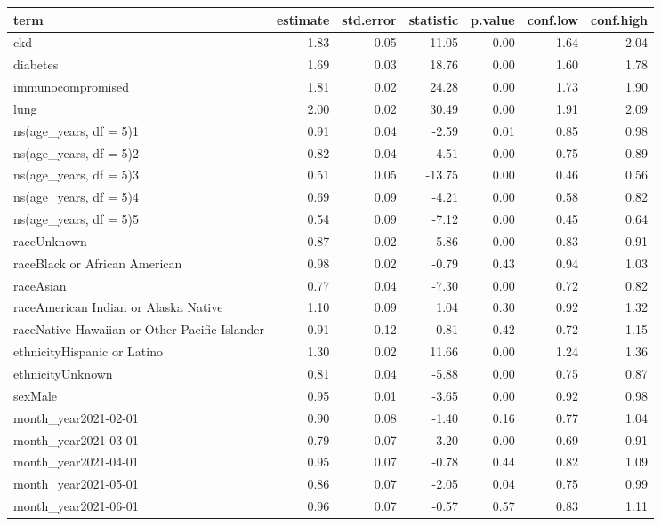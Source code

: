 \begin{table}[!htbp]
\centering
\begin{tabular}{lrrrrrr}
  \hline
term & estimate & std.error & statistic & p.value & conf.low & conf.high \\ 
  \hline
ckd & 1.83 & 0.05 & 11.05 & 0.00 & 1.64 & 2.04 \\ 
  diabetes & 1.69 & 0.03 & 18.76 & 0.00 & 1.60 & 1.78 \\ 
  immunocompromised & 1.81 & 0.02 & 24.28 & 0.00 & 1.73 & 1.90 \\ 
  lung & 2.00 & 0.02 & 30.49 & 0.00 & 1.91 & 2.09 \\ 
  ns(age\_years, df = 5)1 & 0.91 & 0.04 & -2.59 & 0.01 & 0.85 & 0.98 \\ 
  ns(age\_years, df = 5)2 & 0.82 & 0.04 & -4.51 & 0.00 & 0.75 & 0.89 \\ 
  ns(age\_years, df = 5)3 & 0.51 & 0.05 & -13.75 & 0.00 & 0.46 & 0.56 \\ 
  ns(age\_years, df = 5)4 & 0.69 & 0.09 & -4.21 & 0.00 & 0.58 & 0.82 \\ 
  ns(age\_years, df = 5)5 & 0.54 & 0.09 & -7.12 & 0.00 & 0.45 & 0.64 \\ 
  raceUnknown & 0.87 & 0.02 & -5.86 & 0.00 & 0.83 & 0.91 \\ 
  raceBlack or African American & 0.98 & 0.02 & -0.79 & 0.43 & 0.94 & 1.03 \\ 
  raceAsian & 0.77 & 0.04 & -7.30 & 0.00 & 0.72 & 0.82 \\ 
  raceAmerican Indian or Alaska Native & 1.10 & 0.09 & 1.04 & 0.30 & 0.92 & 1.32 \\ 
  raceNative Hawaiian or Other Pacific Islander & 0.91 & 0.12 & -0.81 & 0.42 & 0.72 & 1.15 \\ 
  ethnicityHispanic or Latino & 1.30 & 0.02 & 11.66 & 0.00 & 1.24 & 1.36 \\ 
  ethnicityUnknown & 0.81 & 0.04 & -5.88 & 0.00 & 0.75 & 0.87 \\ 
  sexMale & 0.95 & 0.01 & -3.65 & 0.00 & 0.92 & 0.98 \\ 
  month\_year2021-02-01 & 0.90 & 0.08 & -1.40 & 0.16 & 0.77 & 1.04 \\ 
  month\_year2021-03-01 & 0.79 & 0.07 & -3.20 & 0.00 & 0.69 & 0.91 \\ 
  month\_year2021-04-01 & 0.95 & 0.07 & -0.78 & 0.44 & 0.82 & 1.09 \\ 
  month\_year2021-05-01 & 0.86 & 0.07 & -2.05 & 0.04 & 0.75 & 0.99 \\ 
  month\_year2021-06-01 & 0.96 & 0.07 & -0.57 & 0.57 & 0.83 & 1.11 \\ 

\end{tabular}
\end{table}
